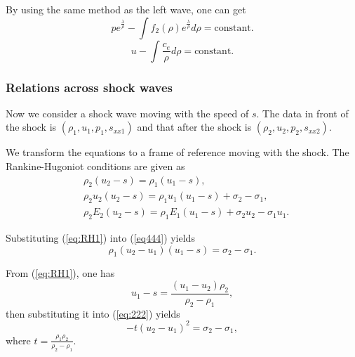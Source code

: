 \documentclass[review]{elsarticle}
\numberwithin{equation}{section}
\numberwithin{table}{section}
\begin{document}
By using the same method as the left wave, one can get
\begin{equation}\label{eq:prhoER}
  p e^{\frac{\lambda}{\rho}} - \int f_2(\rho) e^{\frac{\lambda}{\rho}}d\rho = \text{constant}.
\end{equation}
\begin{equation}\label{eq:urhoER}
  u-\int\frac{c_e}{\rho} d\rho = \text{constant}.
\end{equation}

\subsubsection{Relations across  shock waves}\label{sec:shock}
Now we consider a shock wave moving with the speed of $s$. The data in front of the shock is $(\rho_1,u_1,p_1,s_{xx1})$ and that after the shock is $(\rho_2,u_2,p_2,s_{xx2})$.

We transform the equations  to a  frame of reference moving with the shock. The Rankine-Hugoniot conditions are given as
\begin{align}
\label{eq:RH1}
  &\rho_2(u_2-s) = \rho_1(u_1-s), \\
\label{eq444}
  &\rho_2u_2(u_2-s) = \rho_1u_1(u_1-s)+\sigma_2-\sigma_1,\\
\label{eq:RH3}
  &\rho_2E_2(u_2-s) = \rho_1E_1(u_1-s)+\sigma_2 u_2-\sigma_1u_1.
\end{align}

Substituting (\ref{eq:RH1}) into (\ref{eq444}) yields
\begin{equation}\label{eq:222}
  \rho_1(u_2-u_1)(u_1-s) = \sigma_2-\sigma_1.
\end{equation}

From (\ref{eq:RH1}), one has
\begin{equation}
  u_1-s = \frac{(u_1 - u_2)\rho_2}{\rho_2 -\rho_1},
\end{equation}
then substituting it into (\ref{eq:222}) yields
\begin{equation}\label{eq:u2u1}
  -t(u_2-u_1)^2 = \sigma_2-\sigma_1,
\end{equation}
where $ t=\frac{\rho_1 \rho_2}{\rho_2-\rho_1}$.
\end{document}

